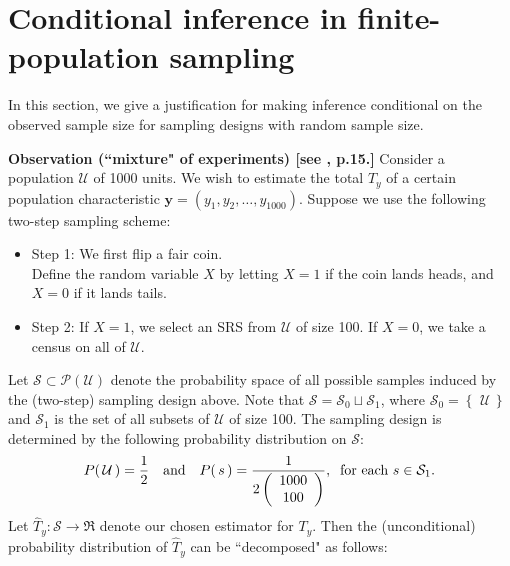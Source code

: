 \documentclass{article}
\begin{document}

\section{Conditional inference in finite-population sampling}
\setcounter{theorem}{0}

In this section, we give a justification for making inference conditional on the observed sample size
for sampling designs with random sample size.

\vskip 0.5cm
\noindent
\textbf{Observation (``mixture" of experiments) [see \cite{Valliant2000}, p.15.]}\vskip 0.1cm
\noindent
Consider a population $\mathcal{U}$ of 1000 units.
We wish to estimate the total $T_{y}$ of a certain population characteristic $\mathbf{y} = (y_{1},y_{2},\ldots,y_{1000})$.
Suppose we use the following two-step sampling scheme:
\begin{itemize}
\item	Step 1: We first flip a fair coin.\\
		Define the random variable $X$ by letting $X = 1$ if the coin lands heads, and $X = 0$ if it lands tails.
\item	Step 2: If $X = 1$, we select an SRS from $\mathcal{U}$ of size 100. If $X = 0$, we take a census on all of $\mathcal{U}$.
\end{itemize}
Let $\mathcal{S} \subset \mathcal{P}(\mathcal{U})$ denote the probability space of all
possible samples induced by the (two-step) sampling design above.
Note that $\mathcal{S} = \mathcal{S}_{0} \sqcup \mathcal{S}_{1}$,
where $\mathcal{S}_{0} = \left\{\,\,\mathcal{U}\,\right\}$ and
$\mathcal{S}_{1}$ is the set of all subsets of $\mathcal{U}$ of size 100.
The sampling design is determined by the following probability distribution on $\mathcal{S}$:
\begin{equation*}
P\!\left(\,\mathcal{U}\,\right) = \dfrac{1}{2}
\quad\textnormal{and}\quad
P\!\left(\,s\,\right) = \frac{1}{2\left(\begin{array}{c}1000\\100\end{array}\right)},
\;\;\textnormal{for each $s \in \mathcal{S}_{1}$}.
\end{equation*}
Let $\widehat{T}_{y}:\mathcal{S} \longrightarrow \Re$ denote our chosen estimator for $T_{y}$.
Then the (unconditional) probability distribution of $\widehat{T}_{y}$ can be ``decomposed" as follows:
\end{document}
